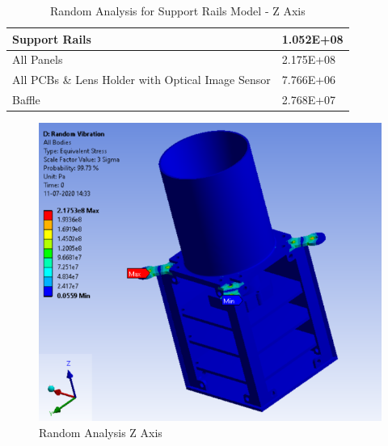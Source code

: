 \documentclass[../../main.tex]{subfiles}
\begin{document}
\begin{enumerate}
\begin{enumerate}
\begin{enumerate}
\begin{itemize}
\begin{table}[h!]
\begin{tabular}{|p{8cm}|p{5cm}|}
                        Support Rails & 1.052E+08 \\
                        \hline
                        All Panels & 2.175E+08 \\
                        \hline
                        All PCBs \& Lens Holder with Optical Image Sensor & 7.766E+06 \\
                        \hline
                        Baffle & 2.768E+07 \\
                        \hline
                        \end{tabular}
                        \caption{Random Analysis for Support Rails Model - Z Axis}
                        \label{tab:my_label}
                    \end{table}
                    \begin{figure}[H]
                        \centering
                        \includegraphics[scale=0.9]{Figures/Mechanical/Random_Z.PNG}
                        \caption{Random Analysis Z Axis}
                        \label{fig:sys_CAD}
                    \end{figure}
                \end{itemize}
            \end{enumerate} 
        \end{enumerate}
    \end{enumerate}

\end{document}
